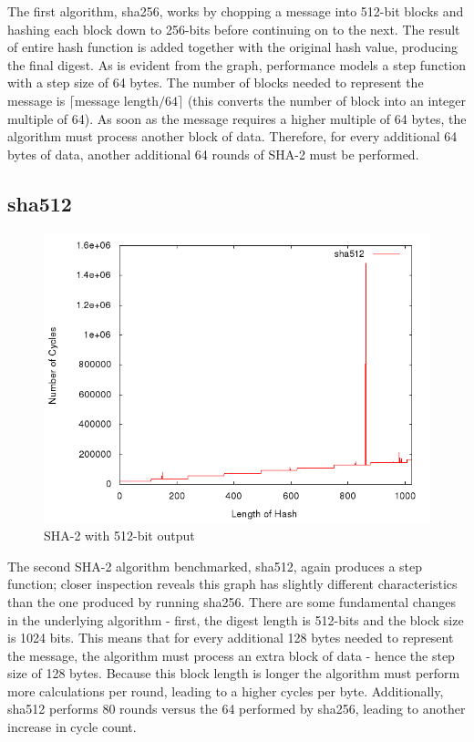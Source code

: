 \documentclass[10pt,a4paper]{article}
\begin{document}
The first algorithm, sha256, works by chopping a message into 512-bit blocks and hashing each block down to 256-bits before continuing on to the next.  The result of entire hash function is added together with the original hash value, producing the final digest.  As is evident from the graph, performance models a step function with a step size of 64 bytes.  The number of blocks needed to represent the message is $\lceil$message length$/ 64 \rceil$ (this converts the number of block into an integer multiple of 64).  As soon as the message requires a higher multiple of 64 bytes, the algorithm must process another block of data.  Therefore, for every additional 64 bytes of data, another additional 64 rounds of SHA-2 must be performed.

\subsection{sha512}

    \begin{figure}[H]
        \begin{center}
            \includegraphics[scale=0.5]{images/sha512.png} 
            \caption{SHA-2 with 512-bit output}
        \end{center}
    \end{figure}

The second SHA-2 algorithm benchmarked, sha512, again produces a step function; closer inspection reveals this graph has slightly different characteristics than the one produced by running sha256.  There are some fundamental changes in the underlying algorithm - first, the digest length is 512-bits and the block size is 1024 bits.  This means that for every additional 128 bytes needed to represent the message, the algorithm must process an extra block of data - hence the step size of 128 bytes.  Because this block length is longer the algorithm must perform more calculations per round, leading to a higher cycles per byte.  Additionally, sha512 performs 80 rounds versus the 64 performed by sha256, leading to another increase in cycle count.
\end{document}

